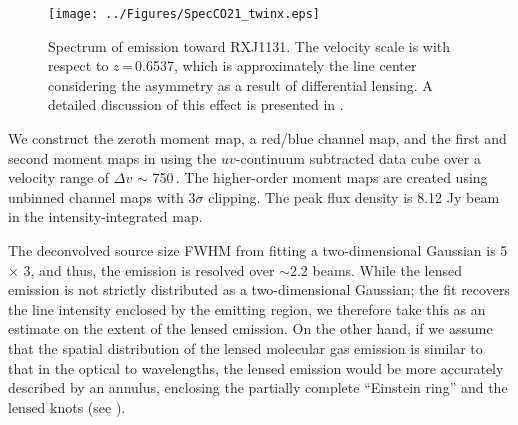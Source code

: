 \documentclass[]{emulateapj}
\begin{document}
\begin{figure}[!htbp]
\centering
\texttt{[image: ../Figures/SpecCO21\_twinx.eps]}
\caption{ Spectrum of \bco emission toward RXJ1131. The velocity scale
is with respect to $z$\,=\,0.6537, which is approximately the line center
considering the asymmetry as a result of differential lensing.
A detailed discussion of this effect is presented in
.
 \label{fig:CO21spec}}
\end{figure}

We construct the zeroth moment map, a red/blue channel map, and
the first and second moment maps in 
using the $uv$-continuum subtracted data cube over a velocity range of
$\Delta v$ $\sim$ 750\,\kms.
The higher-order moment maps are created using
unbinned channel maps with 3$\sigma$ clipping.
The peak flux density is 8.12 Jy\,\kms\,beam\pmOne
in the intensity-integrated map.

The deconvolved source size FWHM from fitting a two-dimensional Gaussian
is 5 $\times$ 3,
and thus, the emission is resolved over $\sim$2.2 beams.
While the lensed emission is not strictly distributed as a two-dimensional
Gaussian;
the fit recovers the line intensity enclosed by the emitting
region, we therefore take this as an estimate on the extent of the lensed
emission. On the other hand, if we assume that the spatial distribution of
the lensed molecular gas emission is similar to that in the optical to \nir
wavelengths, the lensed emission would be more accurately described by an
annulus, enclosing the partially complete ``Einstein ring'' and
the lensed knots (see ).
\end{document}

